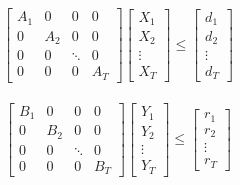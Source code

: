 \documentclass[11pt]{article} %
\begin{document}
\begin{align} 
    \begin{bmatrix}
        A_1 & 0 & 0 & 0\\
        0 & A_2 & 0 & 0\\
        0 & 0 & \ddots  & 0\\
        0 & 0 & 0 & A_T
    \end{bmatrix} 
    \begin{bmatrix}
        X_1\\
        X_2\\
        \vdots \\
        X_T
    \end{bmatrix} \leq
    \begin{bmatrix}
        d_1\\
        d_2\\
        \vdots \\
        d_T
    \end{bmatrix}
\end{align}

\begin{align} 
    \begin{bmatrix}
        B_1 & 0 & 0 & 0\\
        0 & B_2 & 0 & 0\\
        0 & 0 & \ddots  & 0\\
        0 & 0 & 0 & B_T
    \end{bmatrix} 
    \begin{bmatrix}
        Y_1\\
        Y_2\\
        \vdots \\
        Y_T
    \end{bmatrix} \leq
    \begin{bmatrix}
        r_1\\
        r_2\\
        \vdots \\
        r_T
    \end{bmatrix}
\end{align}
\end{document}
